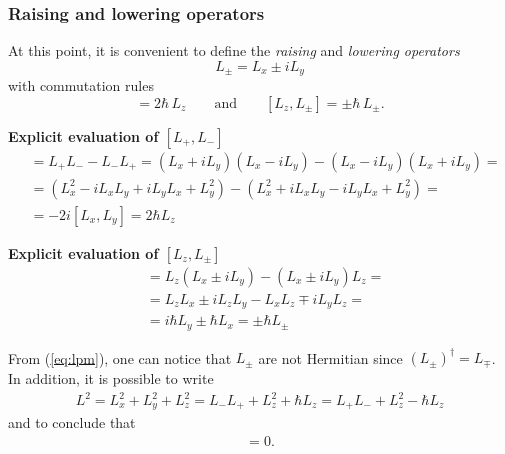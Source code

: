 \subsubsection{Raising and lowering operators}

At this point, it is convenient to define the \textit{raising} and \textit{lowering operators}
\begin{equation}
    L_\pm = L_x \pm i L_y
    \label{eq:lpm}
\end{equation}
with commutation rules
\begin{equation}
    [L_+,L_-] = 2 \hbar \, L_z \qquad \text{and} \qquad [L_z,L_\pm] = \pm \hbar \, L_\pm.
\end{equation}

\begin{tcolorbox}
\textbf{Explicit evaluation of $[L_+,L_-]$} 
    \begin{align*}
    [L_+,L_-] & = L_+ L_- - L_- L_+ = (L_x + iL_y)(L_x - iL_y) - (L_x - iL_y)(L_x + iL_y) = \\
    & = (L_x^2 -i L_xL_y +i L_yL_x + L_y^2) - (L_x^2 + iL_xL_y - iL_yL_x + L_y^2) = \\
    & = -2i [L_x,L_y] = 2\hbar L_z
\end{align*} 
\end{tcolorbox}

\begin{tcolorbox}
\textbf{Explicit evaluation of $[L_z,L_\pm]$} 
    \begin{align*}
    [L_z,L_\pm] &= L_z(L_x \pm iL_y)-(L_x \pm iL_y)L_z = \\
    & = L_zL_x\pm iL_zL_y-L_xL_z\mp iL_yL_z = \\
    & = i\hbar L_y \pm \hbar L_x = \pm \hbar L_\pm
    \end{align*}
\end{tcolorbox}

From (\ref{eq:lpm}), one can notice that $L_\pm$ are not Hermitian since $(L_\pm)^\dagger = L_\mp$. In addition, it is possible to write 
\begin{align}
    L^2 = L_x^2 + L_y^2 + L_z^2 = L_- L_+ + L_z^2 + \hbar L_z = L_+ L_- + L_z^2 - \hbar L_z  
    \label{eq:L2}
\end{align}
and to conclude that 
\begin{align}
    [L^2,L_\pm] = 0. 
\end{align}

